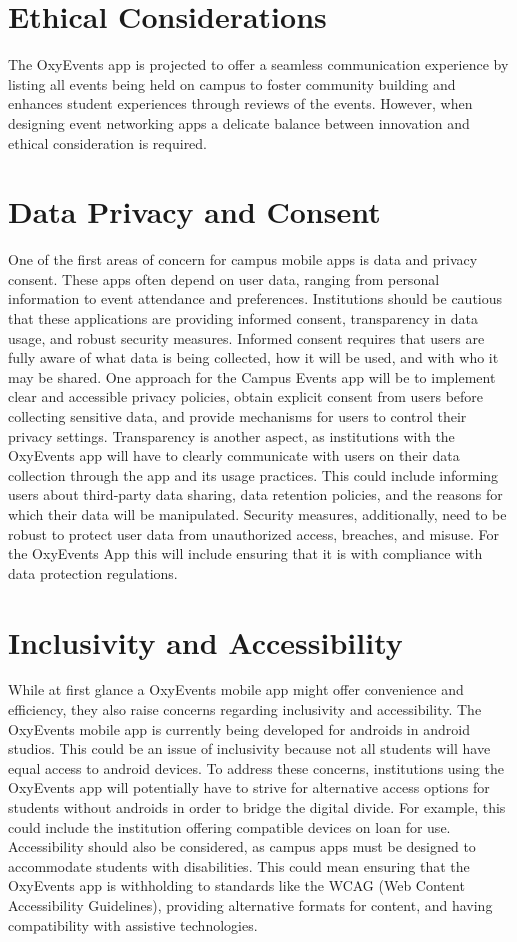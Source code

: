 \documentclass[10pt,twocolumn]{article}
\begin{document}
\section{Ethical Considerations}
The OxyEvents app is projected to offer a seamless communication experience by listing all events being held on campus to foster community building and enhances student experiences through reviews of the events. However, when designing event networking apps a delicate balance between innovation and ethical consideration is required.\cite{Appedus}

\section{Data Privacy and Consent}
One of the first areas of concern for campus mobile apps is data and privacy consent. These apps often depend on user data, ranging from personal information to event attendance and preferences. Institutions should be cautious that these applications are providing informed consent, transparency in data usage, and robust security measures.\cite{Appedus}\cite{UofW_IT}\cite{ANA_MobileMarketing}
Informed consent requires that users are fully aware of what data is being collected, how it will be used, and with who it may be shared. One approach for the Campus Events app will be to implement clear and accessible privacy policies, obtain explicit consent from users before collecting sensitive data, and provide mechanisms for users to control their privacy settings.
Transparency is another aspect, as institutions with the OxyEvents app will have to clearly communicate with users on their data collection through the app and its usage practices. This could include informing users about third-party data sharing, data retention policies, and the reasons for which their data will be manipulated.
Security measures, additionally, need to be robust to protect user data from unauthorized access, breaches, and misuse. For the OxyEvents App this will include ensuring that it is with compliance with data protection regulations.

\section{Inclusivity and Accessibility}
While at first glance a OxyEvents mobile app might offer convenience and efficiency, they also raise concerns regarding inclusivity and accessibility. The OxyEvents mobile app is currently being developed for androids in android studios. This could be an issue of inclusivity because not all students will have equal access to android devices. 
To address these concerns, institutions using the OxyEvents app will potentially have to strive for alternative access options for students without androids in order to bridge the digital divide. For example, this could include the institution offering compatible devices on loan for use.
Accessibility should also be considered, as campus apps must be designed to accommodate students with disabilities. This could mean ensuring that the OxyEvents app is withholding to standards like the WCAG (Web Content Accessibility Guidelines)\cite{WCAG}, providing alternative formats for content, and having compatibility with assistive technologies.
\end{document}
